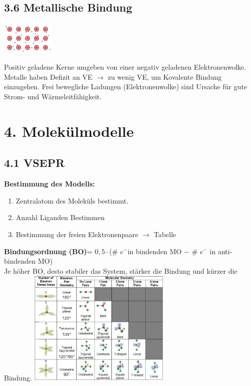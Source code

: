 \begin{multicols*}{4}
\subsection{3.6 Metallische Bindung}{    

        \begin{minipage}{25mm}
            \includegraphics[width=2.5cm]{Bilder/Metallische Bindung.png}
        \end{minipage}
        \begin{minipage}{42mm}
            Positiv geladene Kerne umgeben von einer negativ geladenen Elektronenwolke. Metalle haben
            Defizit an VE $\rightarrow$ zu wenig VE, um Kovalente Bindung einzugehen. Frei bewegliche Ladungen 
            (Elektronenwolke) sind Ursache für gute Strom- und Wärmeleitfähigkeit.
        \end{minipage}
}


\section{4. Molekülmodelle}
\subsection{4.1 VSEPR}{

\textbf{Bestimmung des Modells:}
\begin{enumerate}[noitemsep,leftmargin=*]
    \item Zentralatom des Moleküls bestimmt.
    \item Anzahl Liganden Bestimmen
    \item Bestimmung der freien Elektronenpaare $\rightarrow$ Tabelle
\end{enumerate}

\textbf{Bindungsordnung (BO)}=  $0,5\cdot$(\# $e^-$in bindenden MO $-$ \# $e^-$ in anti-bindenden MO)\\
Je höher BO, desto stabiler das System, stärker die Bindung und kürzer die Bindung.
\includegraphics[width=68mm]{Bilder/VSEPER.PNG}
}



\end{multicols*}
